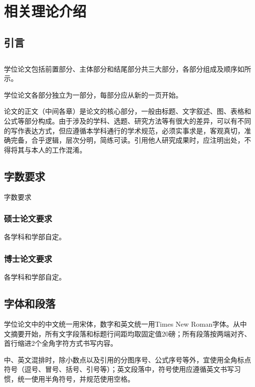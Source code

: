 


\chapter{相关理论介绍
}
\thispagestyle{others}
\pagestyle{others}
\xiaosi

\section{引言}


\section{}

学位论文包括前置部分、主体部分和结尾部分共三大部分，各部分组成及顺序如所示。

学位论文各部分独立为一部分，每部分应从新的一页开始。

论文的正文（中间各章）是论文的核心部分，一般由标题、文字叙述、图、表格和公式等部分构成。由于涉及的学科、选题、研究方法等有很大的差异，可以有不同的写作表达方式，但应遵循本学科通行的学术规范，必须实事求是，客观真切，准确完备，合乎逻辑，层次分明，简练可读。引用他人研究成果时，应注明出处，不得将其与本人的工作混淆。


\section{字数要求}
字数要求


\subsection{硕士论文要求}

各学科和学部自定。

\subsection{博士论文要求}

各学科和学部自定。

\section{字体和段落}
学位论文中的中文统一用宋体，数字和英文统一用Times New Roman字体。从中文摘要开始，所有文字段落和标题行间距均取固定值20磅；所有段落按两端对齐、首行缩进2个全角字符方式书写内容。

中、英文混排时，除小数点以及引用的分图序号、公式序号等外，宜使用全角标点符号（逗号、冒号、括号、引号等）；英文段落中，符号使用应遵循英文书写习惯，统一使用半角符号，并规范使用空格。

